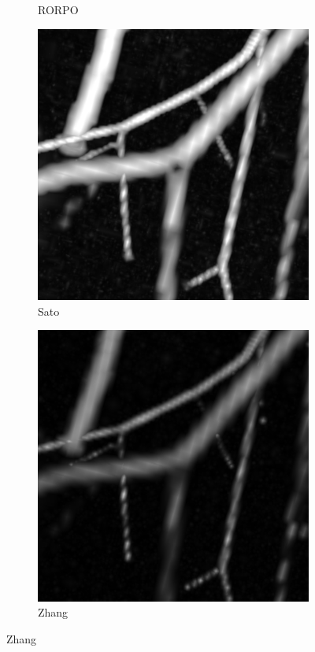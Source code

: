 \begin{figure}[!ht]
\begin{subfigure}[t]{0.30\textwidth}
      \caption{RORPO}
    \end{subfigure}
    \begin{subfigure}[t]{0.30\textwidth}
      \includegraphics[clip = true, trim  =  170 230 150 240, width=\textwidth]{Images/Vascu_2_k_Sato.png}
      \caption{Sato}
    \end{subfigure}
    \begin{subfigure}[t]{0.30\textwidth}
      \includegraphics[clip = true, trim  =  170 230 150 240, width=\textwidth]{Images/Vascu_2_k_Zhang.png}
      \caption{Zhang}
    \end{subfigure}


\end{figure}
